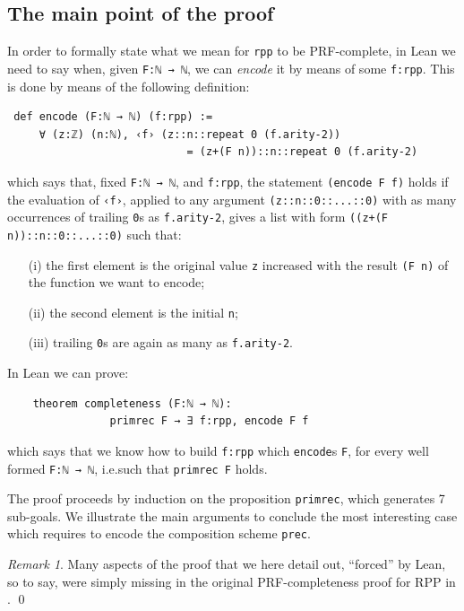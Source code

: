 \documentclass[preprint]{elsarticle}
\theoremstyle{remark}
\newtheorem{remark}{Remark}
\newcommand{\RPP}{\textsf{RPP}\xspace}
\newcommand{\PRF}{\textsf{PRF}\xspace}
\newcommand{\LEAN}{\textsf{Lean}\xspace}
\begin{document}
\subsection{The main point of the proof}
In order to formally state what we mean for \lstinline|rpp| to be \PRF-complete, in \LEAN we need to say when, given \lstinline|F:ℕ → ℕ|, we can \emph{encode} it by means of some \lstinline|f:rpp|. This is done by means of the following definition:
\begin{lstlisting}
 def encode (F:ℕ → ℕ) (f:rpp) :=
     ∀ (z:ℤ) (n:ℕ), ‹f› (z::n::repeat 0 (f.arity-2))
                            = (z+(F n))::n::repeat 0 (f.arity-2)
\end{lstlisting}
which says that, fixed \lstinline|F:ℕ → ℕ|, and \lstinline|f:rpp|, the statement \lstinline|(encode F f)| holds if the evaluation of \lstinline|‹f›|, applied to any argument \lstinline|(z::n::0::...::0)| with as many occurrences of trailing \lstinline|0|s as \lstinline|f.arity-2|, gives a list with form \lstinline|((z+(F n))::n::0::...::0)| such that:
\begin{enumerate}
    \item[(i)]
    the first element is the original value \lstinline|z| increased with the result \lstinline|(F n)| of the function we want to encode;
    \item[(ii)]
    the second element is the initial \lstinline|n|;
    \item[(iii)]
    trailing \lstinline|0|s are again as many as \lstinline|f.arity-2|.
\end{enumerate}
In \LEAN we can prove:
\begin{lstlisting}
    theorem completeness (F:ℕ → ℕ):
                primrec F → ∃ f:rpp, encode F f
\end{lstlisting}
which says that we know how to build \lstinline|f:rpp| which \lstinline|encode|s \lstinline|F|, for every well formed \lstinline|F:ℕ → ℕ|, i.e.\@ such that \lstinline|primrec F| holds.

The proof proceeds by induction on the proposition \lstinline|primrec|, which generates 7 sub-goals. We illustrate the main arguments to conclude the most interesting case which requires to encode the composition scheme \lstinline|prec|.

\begin{remark}
Many aspects of the proof that we here detail out, ``forced'' by \LEAN, so to say, were simply missing in the original \PRF-completeness proof for \RPP in \cite{DBLP:journals/tcs/PaoliniPR20}.
\qed
\end{remark}
\end{document}
